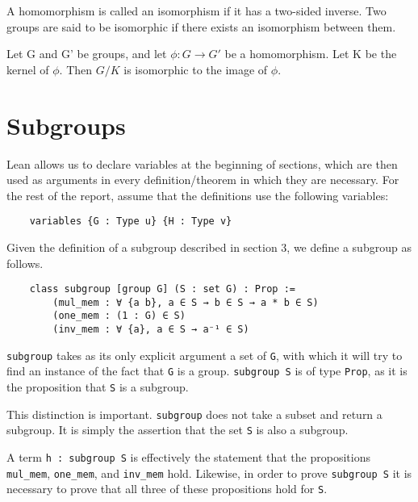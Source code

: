\documentclass[runningheads,a4paper]{llncs}
\renewcommand{\-}{\setminus}
\begin{document}
\begin{definition}[Isomorphism]
A homomorphism is called an isomorphism if it has a two-sided inverse. Two groups are said to be isomorphic if there exists an isomorphism between them.
\end{definition}

\begin{theorem}
Let G and G' be groups, and let $\phi : G \to G'$ be a homomorphism. Let K be the kernel of $\phi$. Then $G/K$ is isomorphic to the image of $\phi$.
\end{theorem}

\section{Subgroups}

Lean allows us to declare variables at the beginning of sections, which are then used as arguments in every definition/theorem in which they are necessary. For the rest of the report, assume that the definitions use the following variables:

\begin{lstlisting}
    variables {G : Type u} {H : Type v}
\end{lstlisting}

Given the definition of a subgroup described in section 3, we define a subgroup as follows.

\begin{lstlisting}
    class subgroup [group G] (S : set G) : Prop := 
        (mul_mem : ∀ {a b}, a ∈ S → b ∈ S → a * b ∈ S) 
        (one_mem : (1 : G) ∈ S)
        (inv_mem : ∀ {a}, a ∈ S → a⁻¹ ∈ S) 
\end{lstlisting}

\lstinline{subgroup} takes as its only explicit argument a set of \lstinline{G}, with which it will try to find an instance of the fact that \lstinline{G} is a group. \lstinline{subgroup S} is of type \lstinline{Prop}, as it is the proposition that \lstinline{S} is a subgroup.

This distinction is important. \lstinline{subgroup} does not take a subset and return a subgroup. It is simply the assertion that the set \lstinline{S} is also a subgroup.

A term \lstinline{h : subgroup S} is effectively the statement that the propositions \lstinline{mul_mem}, \lstinline{one_mem}, and \lstinline{inv_mem} hold. Likewise, in order to prove \lstinline{subgroup S} it is necessary to prove that all three of these propositions hold for \lstinline{S}.
\end{document}
